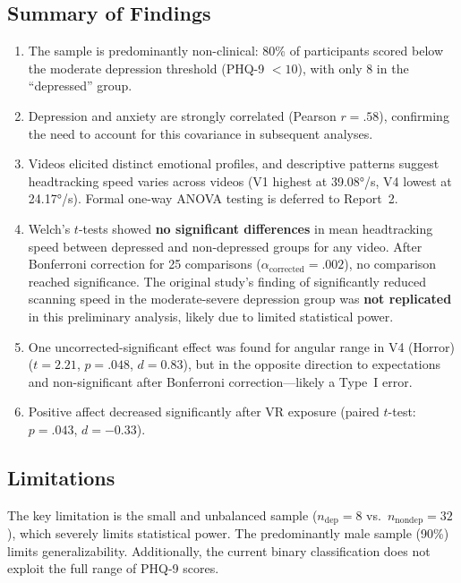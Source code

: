 \documentclass[12pt]{article}
\begin{document}
\subsection{Summary of Findings}
\begin{enumerate}
    \item The sample is predominantly non-clinical: 80\% of participants scored below the moderate depression threshold (PHQ-9 $< 10$), with only 8 in the ``depressed'' group.
    \item Depression and anxiety are strongly correlated (Pearson $r = .58$), confirming the need to account for this covariance in subsequent analyses.
    \item Videos elicited distinct emotional profiles, and descriptive patterns suggest headtracking speed varies across videos (V1 highest at 39.08°/s, V4 lowest at 24.17°/s). Formal one-way ANOVA testing is deferred to Report~2.
    \item Welch's $t$-tests showed \textbf{no significant differences} in mean headtracking speed between depressed and non-depressed groups for any video. After Bonferroni correction for 25 comparisons ($\alpha_{\text{corrected}} = .002$), no comparison reached significance. The original study's finding of significantly reduced scanning speed in the moderate-severe depression group \citep{srivastava2025headscan} was \textbf{not replicated} in this preliminary analysis, likely due to limited statistical power.
    \item One uncorrected-significant effect was found for angular range in V4 (Horror) ($t = 2.21$, $p = .048$, $d = 0.83$), but in the opposite direction to expectations and non-significant after Bonferroni correction---likely a Type~I error.
    \item Positive affect decreased significantly after VR exposure (paired $t$-test: $p = .043$, $d = -0.33$).
\end{enumerate}

\subsection{Limitations}
The key limitation is the small and unbalanced sample ($n_{\text{dep}} = 8$ vs.\ $n_{\text{nondep}} = 32$), which severely limits statistical power. The predominantly male sample (90\%) limits generalizability. Additionally, the current binary classification does not exploit the full range of PHQ-9 scores.
\end{document}
